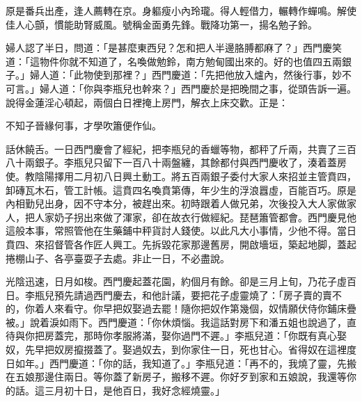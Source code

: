\begin{myquote}
原是番兵出產，逢人薦轉在京。身軀瘦小內玲瓏。得人輕借力，輾轉作蟬鳴。解使佳人心顫，慣能助腎威風。號稱金面勇先鋒。戰降功第一，揚名勉子鈴。
\end{myquote}

婦人認了半日，問道：「是甚麼東西兒？怎和把人半邊胳膊都麻了？」{}西門慶笑道：「這物件你就不知道了，名喚做勉鈴，南方勉甸國出來的。好的也值四五兩銀子。」婦人道：「此物使到那裡？」西門慶道：「先把他放入爐內，然後行事，妙不可言。」婦人道：「你與李瓶兒也幹來？」{}西門慶於是把晚間之事，從頭告訴一遍。說得金蓮淫心頓起，兩個白日裡掩上房門，解衣上床交歡。正是：

\begin{myquote}
不知子晉緣何事，才學吹簫便作仙。
\end{myquote}

話休饒舌。一日西門慶會了經紀，把李瓶兒的香蠟等物，都秤了斤兩，共賣了三百八十兩銀子。李瓶兒只留下一百八十兩盤纏，其餘都付與西門慶收了，湊着蓋房使。教陰陽擇用二月初八日興土動工。將五百兩銀子委付大家人來招並主管賁四，卸磚瓦木石，管工計帳。這賁四名喚賁第傳，年少生的浮浪囂虛，百能百巧。原是內相勤兒出身，因不守本分，被趕出來。初時跟着人做兄弟，次後投入大人家做家人，把人家奶子拐出來做了渾家，{}卻在故衣行做經紀。琵琶簫管都會。西門慶見他這般本事，常照管他在生藥鋪中秤貨討人錢使。以此凡大小事情，少他不得。當日賁四、來招督管各作匠人興工。先拆毀花家那邊舊房，開啟墻垣，築起地脚，蓋起捲棚山子、各亭臺耍子去處。非止一日，不必盡說。

光陰迅速，日月如梭。西門慶起蓋花園，約個月有餘。卻是三月上旬，乃花子虛百日。李瓶兒預先請過西門慶去，和他計議，要把花子虛靈燒了：「房子賣的賣不的，你着人來看守。你早把奴娶過去罷！隨你把奴作第幾個，奴情願伏侍你鋪床疊被。」說着淚如雨下。{}西門慶道：「你休煩惱。我這話對房下和潘五姐也說過了，直待與你把房蓋完，那時你孝服將滿，娶你過門不遲。」李瓶兒道：「你既有真心娶奴，先早把奴房攛掇蓋了。娶過奴去，到你家住一日，死也甘心。{}省得奴在這裡度日如年。」西門慶道：「你的話，我知道了。」李瓶兒道：「再不的，我燒了靈，先搬在五娘那邊住兩日。{}等你蓋了新房子，搬移不遲。你好歹到家和五娘說，我還等你的話。這三月初十日，是他百日，我好念經燒靈。」

